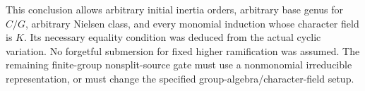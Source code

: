 This conclusion allows arbitrary initial inertia orders, arbitrary base
genus for $C/G$, arbitrary Nielsen class, and every monomial induction
whose character field is $K$. Its necessary equality condition was
deduced from the actual cyclic variation. No forgetful submersion for
fixed higher ramification was assumed. The remaining finite-group
nonsplit-source gate must use a nonmonomial irreducible representation,
or must change the specified group-algebra/character-field setup.
